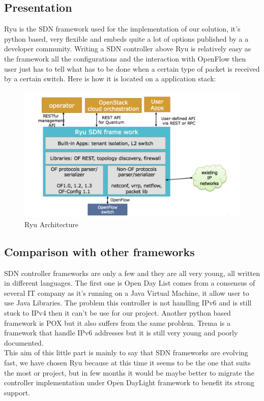 \documentclass{article}
\begin{document}
\subsection{Presentation}
Ryu is the SDN framework used for the implementation of our solution,
it's python based, very flexible and embeds quite a lot of options
published by a a developer community. Writing a SDN controller above
Ryu is relatively easy as the framework all the configurations and the
interaction with OpenFlow then user just has to tell what has to be
done when a certain type of packet is received by a certain switch.
Here is how it is located on a application stack:

\begin{figure}[h!]
  \centering
    \includegraphics[scale=0.3]{reportPictures/ryu_layers.png}
  \caption{Ryu Architecture}
\end{figure}

\subsection{Comparison with other frameworks}
SDN controller frameworks are only a few and they are all very young,
all written in different languages. The first one is Open Day List
comes from a consensus of several IT company as it's running on a
Java Virtual Machine, it allow user to use Java Libraries. The problem
this controller is not handling IPv6 and is still stuck to IPv4 then it
can't be use for our project. Another python based framework is POX
but it also suffers from the same problem. Trema is a framework that
handle IPv6 addresses but it is still very young and poorly documented.\\
\newline
This aim of this little part is mainly to say that SDN frameworks are
evolving fast, we have chosen Ryu because at this time it seems to be
the one that suits the most or project, but in few months it would be
maybe better to migrate the controller implementation under Open
DayLight framework to benefit its strong support.
\end{document}
